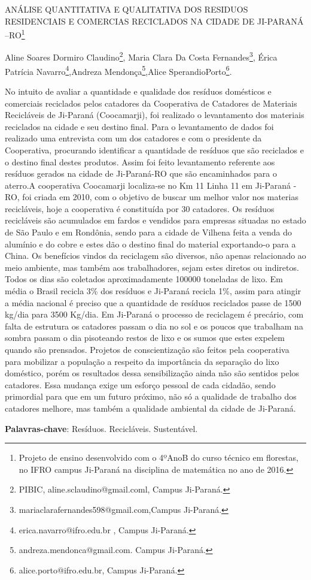 \documentclass[article,12pt,onesidea,4paper,english,brazil]{abntex2}
\begin{document}
	
	
	\frenchspacing 
	
	\begin{center}
		\LARGE ANÁLISE QUANTITATIVA E QUALITATIVA DOS RESIDUOS RESIDENCIAIS E COMERCIAS RECICLADOS NA CIDADE DE JI-PARANÁ –RO\footnote{Projeto de ensino desenvolvido com o 4ºAnoB do curso técnico em florestas, no IFRO campus Ji-Paraná na disciplina de matemática no ano de 2016.}
		
		\normalsize
		Aline Soares Dormiro Claudino\footnote{PIBIC, aline.sclaudino@gmail.coml, Campus Ji-Paraná.}, Maria Clara Da Costa Fernandes\footnote{mariaclarafernandes598@gmail.com,Campus Ji-Paraná.}, Érica Patrícia Navarro\footnote{erica.navarro@ifro.edu.br , Campus Ji-Paraná.},Andreza Mendonça\footnote{andreza.mendonca@gmail.com. Campus Ji-Paraná.},Alice SperandioPorto\footnote{alice.porto@ifro.edu.br, Campus Ji-Paraná.}.		
	\end{center}
	
	\noindent No intuito de avaliar a quantidade e qualidade dos resíduos domésticos e comerciais reciclados pelos catadores da Cooperativa de Catadores de Materiais Recicláveis de Ji-Paraná (Coocamarji), foi realizado o levantamento dos materiais reciclados na cidade e seu destino final. Para o levantamento de dados foi realizado uma entrevista com um dos catadores e com o presidente da Cooperativa, procurando identificar a quantidade de resíduos que são reciclados e o destino final destes produtos. Assim foi feito levantamento referente aos resíduos gerados na cidade de Ji-Paraná-RO que são encaminhados para o aterro.A cooperativa Coocamarji localiza-se no Km 11 Linha 11 em Ji-Paraná - RO, foi criada em 2010, com o objetivo de buscar um melhor valor nos materias recicláveis, hoje a cooperativa é constituída por 30 catadores. Os resíduos recicláveis são acumulados em fardos e vendidos para empresas situadas no estado de São Paulo e em Rondônia, sendo para a cidade de Vilhena feita a venda do alumínio e do cobre e estes dão o destino final do material exportando-o para a China. Os benefícios vindos da reciclagem são diversos, não apenas relacionado ao meio ambiente, mas também aos trabalhadores, sejam estes diretos ou indiretos. Todos os dias são coletados aproximadamente 100000 toneladas de lixo. Em média o Brasil recicla 3\% dos resíduos e Ji-Paraná recicla 1\%, assim para atingir a média nacional é preciso que a quantidade de resíduos reciclados passe de 1500 kg/dia para 3500 Kg/dia. Em Ji-Paraná o processo de reciclagem é precário, com falta de estrutura os catadores passam o dia no sol e os poucos que trabalham na sombra passam o dia pisoteando restos de lixo e os sumos que estes expelem quando são prensados. Projetos de conscientização são feitos pela cooperativa para mobilizar a população a respeito da importância da separação do lixo doméstico, porém os resultados dessa sensibilização ainda não são sentidos pelos catadores. Essa mudança exige um esforço pessoal de cada cidadão, sendo primordial para que em um futuro próximo, não só a qualidade de trabalho dos catadores melhore, mas também a qualidade ambiental da cidade de Ji-Paraná.
	
	\vspace{\onelineskip}
	
	\noindent
	\textbf{Palavras-chave}: Resíduos. Recicláveis. Sustentável.
	
\end{document}
